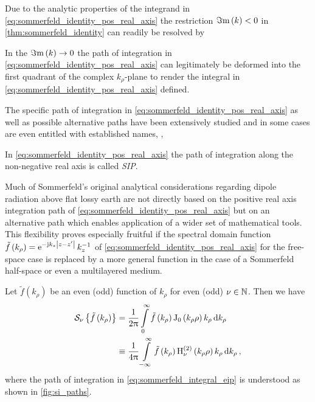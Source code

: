 Due to the analytic properties of the integrand in
\eqref{eq:sommerfeld_identity_pos_real_axis} the restriction $\Im\mathrm{m}\left(k\right) < 0$
in \cref{thm:sommerfeld_identity} can readily be resolved by
\begin{corollary}
	In the $\Im\mathrm{m}\left(k\right) \to 0$ the path of integration in
	\eqref{eq:sommerfeld_identity_pos_real_axis} can legitimately be deformed
	into the first quadrant of the complex $k_\rho$-plane to render the integral
	in \eqref{eq:sommerfeld_identity_pos_real_axis} defined.
\end{corollary}

The specific path of integration in \eqref{eq:sommerfeld_identity_pos_real_axis}
as well as possible alternative paths have been extensively studied and in some
cases are even entitled with established names, \eg,
\begin{definition}
	In \eqref{eq:sommerfeld_identity_pos_real_axis} the path of integration
	along the non-negative real axis is called \emph{\acf{SIP}}.
\end{definition}

Much of Sommerfeld's original analytical considerations
\cite{Sommerfeld1909,Sommerfeld1926} regarding dipole radiation above flat
lossy earth are not directly based on the positive real axis integration path
of \eqref{eq:sommerfeld_identity_pos_real_axis} but on an alternative path
which enables application of a wider set of mathematical tools.
This flexibility proves especially fruitful if the spectral domain function
$\tilde{f} \left(k_\rho\right) = \mathrm{e}^{-\mathrm{j} k_z \left\vert z - z^\prime\right\vert}\, k_z^{-1}$ of
\eqref{eq:sommerfeld_identity_pos_real_axis} for the free-space case is replaced
by a more general function in the case of a Sommerfeld half-space or even a
multilayered medium.
\begin{corollary}
	Let $\tilde{f} \left(k_\rho\right)$ be an even (odd) function of $k_\rho$
	for even (odd) $\nu \in \mathbb{N}$.
	Then we have
	\begin{align}
		\mathcal{S}_{\nu} \left\{\tilde{f} \left( k_\rho \right) \right\}
		&=
		\frac{1}{2\uppi}
		\int\limits_{0}^{\infty}
		\tilde{f} \left(k_\rho\right) 
		\operatorname{J}_{0} \left(k_\rho \rho\right)
		k_\rho 
		\,
		\mathrm{d} k_\rho
		\label{eq:sommerfeld_integral_sip}
		\\
		&\equiv
		\frac{1}{4\uppi}
		\int\limits_{-\infty}^{\infty}
		\tilde{f} \left(k_\rho\right)
		\operatorname{H}_{\nu}^{\left( 2 \right)} \left(k_\rho \rho\right)
		k_\rho
		\,
		\mathrm{d} k_\rho
		\label{eq:sommerfeld_integral_eip}
		\, ,
	\end{align}
	where the path of integration in \eqref{eq:sommerfeld_integral_eip} is
	understood as shown in \cref{fig:si_paths}.
\end{corollary}

